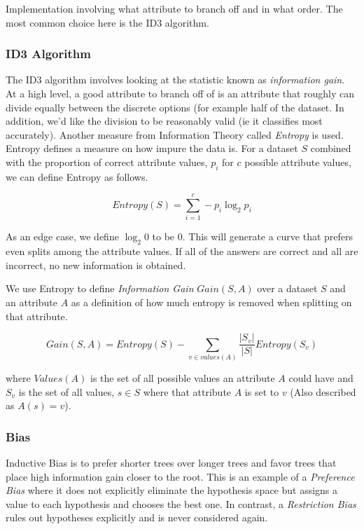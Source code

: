 \documentclass[11pt]{article}
\begin{document}
Implementation involving what attribute to branch off and in what order. The most common choice here is the ID3 algorithm.

\subsubsection*{ID3 Algorithm}

The ID3 algorithm involves looking at the statistic known as \textit{information gain}. At a high level, a good attribute to branch off of is an attribute that roughly can divide equally between the discrete options (for example half of the dataset. In addition, we'd like the division to be reasonably valid (ie it classifies most accurately). Another measure from Information Theory called \textit{Entropy} is used. Entropy defines a measure on how impure the data is. For a dataset $S$ combined with the proportion of correct attribute values, $p_i$ for $c$ possible attribute values, we can define Entropy as follows.

\begin{equation}
Entropy(S) = \sum_{i=1}^{c} -p_i \log_2 p_i
\end{equation}

As an edge case, we define $\log_2 0$ to be $0$. This will generate a curve that prefers even splits among the attribute values. If all of the answers are correct and all are incorrect, no new information is obtained.

We use Entropy to define \textit{Information Gain} $Gain(S, A)$ over a dataset $S$ and an attribute $A$ as a definition of how much entropy is removed when splitting on that attribute.

\begin{equation}
Gain(S,A) = Entropy(S) - \sum_{v \in values(A)} \frac{|S_v|}{|S|} Entropy(S_v)
\end{equation}

where $Values(A)$ is the set of all possible values an attribute $A$ could have and $S_v$ is the set of all values, $s \in S$ where that attribute $A$ is set to $v$ (Also described as $A(s) = v$).

\subsubsection*{Bias}

Inductive Bias is to prefer shorter trees over longer trees and favor trees that place high information gain closer to the root. This is an example of a \textit{Preference Bias} where it does not explicitly eliminate the hypothesis space but assigns a value to each hypothesis and chooses the best one. In contrast, a \textit{Restriction Bias} rules out hypotheses explicitly and is never considered again.
\end{document}

